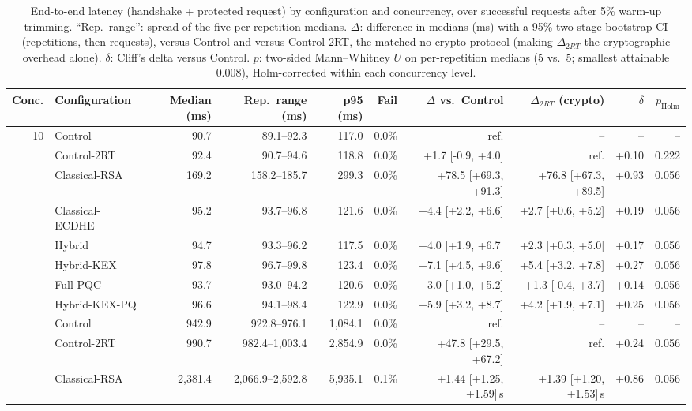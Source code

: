 \begin{table}[t]
\centering
\caption{End-to-end latency (handshake + protected request) by configuration and concurrency, over successful requests after 5\% warm-up trimming. ``Rep.\ range'': spread of the five per-repetition medians. $\Delta$: difference in medians (ms) with a 95\% two-stage bootstrap CI (repetitions, then requests), versus Control and versus Control-2RT, the matched no-crypto protocol (making $\Delta_{2RT}$ the cryptographic overhead alone). $\delta$: Cliff's delta versus Control. $p$: two-sided Mann--Whitney $U$ on per-repetition medians (5 vs.\ 5; smallest attainable 0.008), Holm-corrected within each concurrency level.}
\label{tab:concurrency}
\setlength{\tabcolsep}{2pt}
\footnotesize
\begin{tabular}{@{}rlrrrrrrrr@{}}
\toprule
Conc. & Configuration & Median (ms) & Rep.\ range (ms) & p95 (ms) & Fail & $\Delta$ vs.\ Control & $\Delta_{2RT}$ (crypto) & $\delta$ & $p_{\mathrm{Holm}}$ \\
\midrule
10 & Control & 90.7 & 89.1--92.3 & 117.0 & 0.0\% & ref. & -- & -- & -- \\
 & Control-2RT & 92.4 & 90.7--94.6 & 118.8 & 0.0\% & +1.7 [-0.9, +4.0] & ref. & +0.10 & 0.222 \\
 & Classical-RSA & 169.2 & 158.2--185.7 & 299.3 & 0.0\% & +78.5 [+69.3, +91.3] & +76.8 [+67.3, +89.5] & +0.93 & 0.056 \\
 & Classical-ECDHE & 95.2 & 93.7--96.8 & 121.6 & 0.0\% & +4.4 [+2.2, +6.6] & +2.7 [+0.6, +5.2] & +0.19 & 0.056 \\
 & Hybrid & 94.7 & 93.3--96.2 & 117.5 & 0.0\% & +4.0 [+1.9, +6.7] & +2.3 [+0.3, +5.0] & +0.17 & 0.056 \\
 & Hybrid-KEX & 97.8 & 96.7--99.8 & 123.4 & 0.0\% & +7.1 [+4.5, +9.6] & +5.4 [+3.2, +7.8] & +0.27 & 0.056 \\
 & Full PQC & 93.7 & 93.0--94.2 & 120.6 & 0.0\% & +3.0 [+1.0, +5.2] & +1.3 [-0.4, +3.7] & +0.14 & 0.056 \\
 & Hybrid-KEX-PQ & 96.6 & 94.1--98.4 & 122.9 & 0.0\% & +5.9 [+3.2, +8.7] & +4.2 [+1.9, +7.1] & +0.25 & 0.056 \\
\addlinespace
100 & Control & 942.9 & 922.8--976.1 & 1,084.1 & 0.0\% & ref. & -- & -- & -- \\
 & Control-2RT & 990.7 & 982.4--1,003.4 & 2,854.9 & 0.0\% & +47.8 [+29.5, +67.2] & ref. & +0.24 & 0.056 \\
 & Classical-RSA & 2,381.4 & 2,066.9--2,592.8 & 5,935.1 & 0.1\% & +1.44 [+1.25, +1.59]\,s & +1.39 [+1.20, +1.53]\,s & +0.86 & 0.056 \\

\end{tabular}
\end{table}
